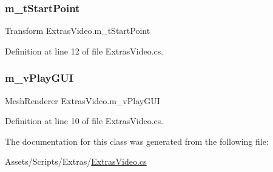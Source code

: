\subsubsection{\texorpdfstring{m\+\_\+t\+Start\+Point}{m\_tStartPoint}}
{\footnotesize\ttfamily Transform Extras\+Video.\+m\+\_\+t\+Start\+Point}



Definition at line 12 of file Extras\+Video.\+cs.

\mbox{\label{class_extras_video_a819bd3f57c903a2019b9f21348696ac2}} 
\subsubsection{\texorpdfstring{m\+\_\+v\+Play\+G\+UI}{m\_vPlayGUI}}
{\footnotesize\ttfamily Mesh\+Renderer Extras\+Video.\+m\+\_\+v\+Play\+G\+UI}



Definition at line 10 of file Extras\+Video.\+cs.



The documentation for this class was generated from the following file\+:\begin{DoxyCompactItemize}
\item 
Assets/\+Scripts/\+Extras/\mbox{\hyperlink{_extras_video_8cs}{Extras\+Video.\+cs}}\end{DoxyCompactItemize}
